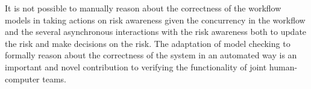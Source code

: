It is not possible to manually reason about the correctness of the workflow models in taking actions on risk awareness given the concurrency in the workflow and the several asynchronous interactions with the risk awareness both to update the risk and make decisions on the risk. The adaptation of model checking to formally reason about the correctness of the system in an automated way is an important and novel contribution to verifying the functionality of joint human-computer teams. 

\begin{comment}
The rest of this paper describes the verification of the workflow against the CWP as a verification requirement. The verification is accomplished with the SPIN model checker. 

The CWP in \figref{fig:cwp} is translated into equivalent Linear Temporal Logic (LTL), and the workflow in \figref{fig:bpmn} is translated into its equivalent Promela model, where Promela is the input language for SPIN. The SPIN model checker then verifies that the workflow in its current form does indeed implement the CWP.
\end{comment}